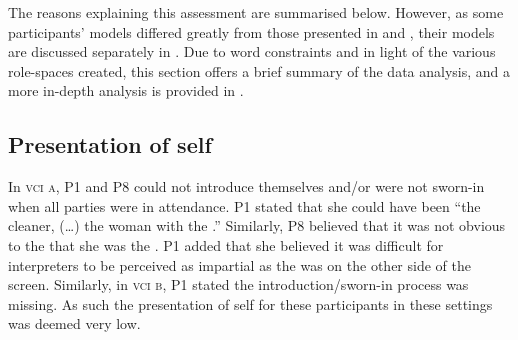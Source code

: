 \documentclass[output=paper]{langsci/langscibook}
\begin{document}
\begin{table}
\caption{Role-space in \textsc{vci b}\label{tab:devaux:3}}
\end{table}

The reasons explaining this assessment are summarised below. However, as some participants’ models differed greatly from those presented in  and , their models are discussed separately in . Due to word constraints and in light of the various role-spaces created, this section offers a brief summary of the data analysis, and a more in-depth analysis is provided in \citet{Devaux2017b}.

\subsection{Presentation of self}
In \textsc{vci a}, P1 and P8 could not introduce themselves and/or were not sworn-in when all parties were in attendance. P1 stated that she could have been “the cleaner, (…) the woman with the .” Similarly, P8 believed that it was not obvious to the  that she was the . P1 added that she believed it was difficult for interpreters to be perceived as impartial as the  was on the other side of the screen. Similarly, in \textsc{vci b}, P1 stated the introduction/sworn-in process was missing. As such the presentation of self for these participants in these settings was deemed very low. 
\end{document}
